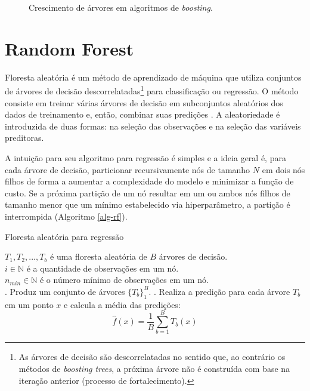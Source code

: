 \begin{apendicesenv}
\begin{figure}
\begin{minipage}[t]{\linewidth}
{{}

}

\end{minipage}%

\caption{\label{fig-tree-growth}Crescimento de árvores em algoritmos de
\emph{boosting}.}

\end{figure}

\section{Random Forest}\label{random-forest}

Floresta aleatória é um método de aprendizado de máquina que utiliza
conjuntos de árvores de decisão descorrelatadas\footnote{As árvores de
  decisão são descorrelatadas no sentido que, ao contrário os métodos de
  \emph{boosting trees}, a próxima árvore não é construída com base na
  iteração anterior (processo de fortalecimento).} para classificação ou
regressão. O método consiste em treinar várias árvores de decisão em
subconjuntos aleatórios dos dados de treinamento e, então, combinar suas
predições \autocite{hastie_elements_2009}. A aleatoriedade é introduzida
de duas formas: na seleção das observações e na seleção das variáveis
preditoras.

A intuição para seu algoritmo para regressão é simples e a ideia geral
é, para cada árvore de decisão, particionar recursivamente nós de
tamanho \(N\) em dois nós filhos de forma a aumentar a complexidade do
modelo e minimizar a função de custo. Se a próxima partição de um nó
resultar em um ou ambos nós filhos de tamanho menor que um mínimo
estabelecido via hiperparâmetro, a partição é interrompida (Algoritmo
\ref{alg-rf}).

\begin{algorithm}
\caption{Floresta aleatória para regressão}\label{alg-rf}

${T_1, T_2, ..., T_b}$ é uma floresta aleatória de $B$ árvores de decisão. \\
\BlankLine
$i \in \mathbb{N}$ é a quantidade de observações em um nó. \\
\BlankLine
$n_{min} \in \mathbb{N}$ é o número mínimo de observações em um nó. \\
\BlankLine
{}
. Produz um conjunto de árvores $\{T_b\}_1^B$.
. Realiza a predição para cada árvore $T_b$ em um ponto $x$ e calcula a média das predições:
$$\hat{f}(x) = \frac{1}{B}\sum_{b=1}^B T_b(x)$$


\end{algorithm}
\end{apendicesenv}

